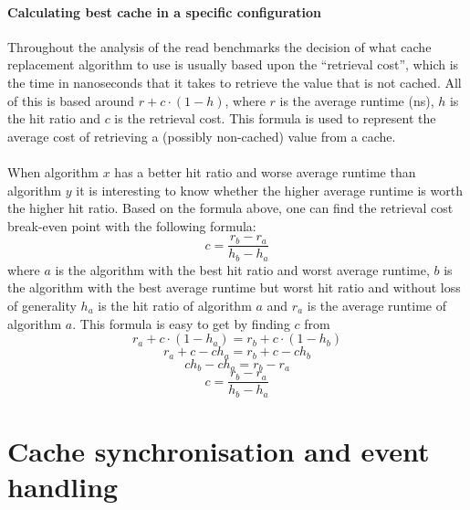 \documentclass[pdftex,a4paper,12pt,twoside]{report}
\begin{document}
\subsubsection{Calculating best cache in a specific configuration}
Throughout the analysis of the read benchmarks the decision of what cache replacement algorithm to use is usually based upon the ``retrieval cost'', which is the time in nanoseconds that it takes to retrieve the value that is not cached. All of this is based around $r + c \cdot (1 - h)$, where $r$ is the average runtime (ns), $h$ is the hit ratio and $c$ is the retrieval cost. This formula is used to represent the average cost of retrieving a (possibly non-cached) value from a cache.
\\\\
When algorithm $x$ has a better hit ratio and worse average runtime than algorithm $y$ it is interesting to know whether the higher average runtime is worth the higher hit ratio. Based on the formula above, one can find the retrieval cost break-even point with the following formula:
\[
c = \frac{r_b-r_a}{h_b-h_a}
\]
where $a$ is the algorithm with the best hit ratio and worst average runtime, $b$ is the algorithm with the best average runtime but worst hit ratio and without loss of generality $h_a$ is the hit ratio of algorithm $a$ and $r_a$ is the average runtime of algorithm $a$. This formula is easy to get by finding $c$ from 
\[
r_a + c \cdot (1 - h_a) = r_b + c \cdot (1 - h_b)
\]\[
r_a + c - ch_a = r_b + c - ch_b
\]\[
ch_b - ch_a = r_b - r_a
\]\[
c = \frac{r_b - r_a}{h_b - h_a}
\]
\chapter{Cache synchronisation and event handling}
\end{document}
